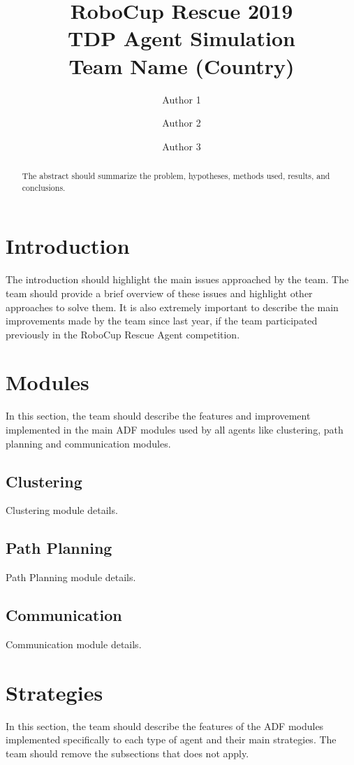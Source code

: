 \documentclass[runningheads,a4paper]{llncs}
\begin{document}
\title{RoboCup Rescue 2019\\
       TDP Agent Simulation\\
       Team Name (Country)}
\author{Author 1 \and Author 2 \and Author 3}
\maketitle
\begin{abstract}
The abstract should summarize the problem, hypotheses, methods used, results, and conclusions.
\end{abstract}
\section{Introduction}
The introduction should highlight the main issues approached by the team. The
team should provide a brief overview of these issues and highlight other
approaches to solve them. It is also extremely important to describe the main
improvements made by the team since last year, if the team participated
previously in the RoboCup Rescue Agent competition.
\section{Modules}
In this section, the team should describe the features and improvement
implemented in the main ADF modules used by all agents like clustering, path
planning and communication modules.
\subsection{Clustering}
Clustering module details.
\subsection{Path Planning}
Path Planning module details.
\subsection{Communication}
Communication module details.
\section{Strategies}
In this section, the team should describe the features of the ADF modules
implemented specifically to each type of agent and their main strategies. The
team should remove the subsections that does not apply.
\end{document}
